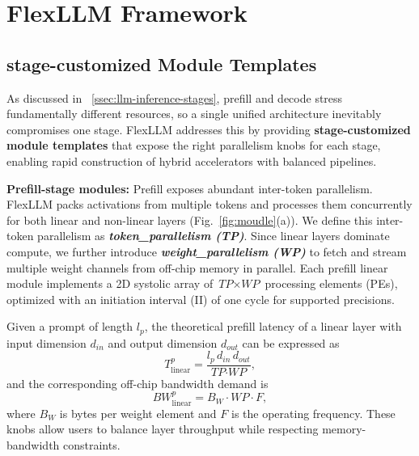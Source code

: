 \documentclass[conference]{IEEEtran}
\begin{document}



\section{FlexLLM Framework}
\subsection{stage-customized Module Templates}

As discussed in ~\ref{ssec:llm-inference-stages}, prefill and decode stress fundamentally different resources, so a single unified architecture inevitably compromises one stage. FlexLLM addresses this by providing \textbf{stage-customized module templates} that expose the right parallelism knobs for each stage, enabling rapid construction of hybrid accelerators with balanced pipelines.

\textbf{Prefill-stage modules:}  
Prefill exposes abundant inter-token parallelism. FlexLLM packs activations from multiple tokens and processes them concurrently for both linear and non-linear layers (Fig.~\ref{fig:moudle}(a)). We define this inter-token parallelism as \textit{\textbf{token\_parallelism (TP)}}. Since linear layers dominate compute, we further introduce \textit{\textbf{weight\_parallelism (WP)}} to fetch and stream multiple weight channels from off-chip memory in parallel. Each prefill linear module implements a 2D systolic array of $\textit{TP}\times\textit{WP}$ processing elements (PEs), optimized with an initiation interval (II) of one cycle for supported precisions. 

Given a prompt of length $l_{p}$, the theoretical prefill latency of a linear layer with input dimension $d_{in}$ and output dimension $d_{out}$ can be expressed as
\begin{equation}
T^{p}_{\text{linear}}=\frac{l_p\, d_{in}\, d_{out}}{\textit{TP}\cdot\textit{WP}},
\label{eq:linear_latency_prefill}
\end{equation}
and the corresponding off-chip bandwidth demand is
\begin{equation}
BW^{p}_{\text{linear}} = B_W \cdot \textit{WP} \cdot F,
\label{eq:linear_bandwidth}
\end{equation}
where $B_W$ is bytes per weight element and $F$ is the operating frequency. These knobs allow users to balance layer throughput while respecting memory-bandwidth constraints.
\end{document}
